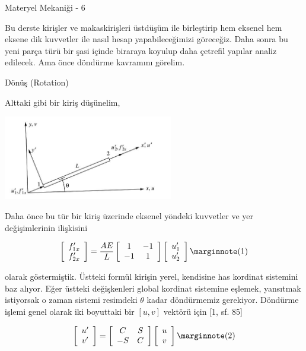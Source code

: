 \documentclass[12pt,fleqn]{article}\usepackage{../../common}
\begin{document}
Materyel Mekaniği - 6

Bu derste kirişler ve makaskirişleri üstdüşüm ile birleştirip hem eksenel hem
eksene dik kuvvetler ile nasıl hesap yapabileceğimizi göreceğiz. Daha sonra bu
yeni parça türü bir şasi içinde biraraya koyulup daha çetrefil yapılar analiz
edilecek. Ama önce döndürme kavramını görelim.

Dönüş (Rotation)

Alttaki gibi bir kiriş düşünelim,

\includegraphics[width=20em]{phy_020_strs_06_01.jpg}

Daha önce bu tür bir kiriş üzerinde eksenel yöndeki kuvvetler ve yer
değişimlerinin ilişkisini

$$
\left[\begin{array}{c}
f'_{1x} \\ f'_{2x}
\end{array}\right] =
\frac{AE}{L}
\left[\begin{array}{cc}
1 & -1 \\ -1 & 1
\end{array}\right]
\left[\begin{array}{c}
u'_1 \\ u'_2
\end{array}\right]
\mlabel{1}
$$

olarak göstermiştik. Üstteki formül kirişin yerel, kendisine has kordinat
sistemini baz alıyor. Eğer üstteki değişkenleri global kordinat sistemine
eşlemek, yansıtmak istiyorsak o zaman sistemi resimdeki $\theta$ kadar döndürmemiz
gerekiyor. Döndürme işlemi genel olarak iki boyuttaki bir $[u, v]$ vektörü için
[1, sf. 85]

$$
\left[\begin{array}{c}
u' \\ v'
\end{array}\right] =
\left[\begin{array}{cc}
C & S \\ -S & C
\end{array}\right]
\left[\begin{array}{c}
u \\ v
\end{array}\right]
\mlabel{2}
$$
\end{document}
